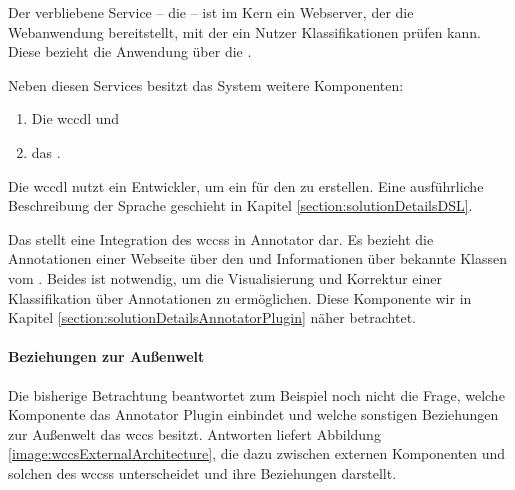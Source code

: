         Der verbliebene Service -- die {\webAppService} -- ist im Kern ein Webserver,
        der die Webanwendung bereitstellt,
        mit der ein Nutzer Klassifikationen prüfen kann.
        Diese bezieht die Anwendung über die {\classificationStorageAPI}.

        Neben diesen Services besitzt das System weitere Komponenten:

        \begin{enumerate}
            \item Die \gls{wccdl} und
            \item das {\annotatorPlugin}.
        \end{enumerate}

        Die \gls{wccdl} nutzt ein Entwickler, um ein {\classificationModel} für den
        {\classificationService} zu erstellen.
        Eine ausführliche Beschreibung der Sprache geschieht in Kapitel \ref{section:solutionDetailsDSL}.

        Das {\annotatorPlugin} stellt eine Integration des \glspl{wccs} in Annotator dar.
        Es bezieht die Annotationen einer Webseite über den {\annotationService}
        und Informationen über bekannte Klassen vom {\classificationService}.
        Beides ist notwendig, um die Visualisierung und Korrektur einer Klassifikation über Annotationen
        zu ermöglichen.
        Diese Komponente wir in Kapitel \ref{section:solutionDetailsAnnotatorPlugin} näher betrachtet.

        \paragraph{Beziehungen zur Außenwelt}
        Die bisherige Betrachtung beantwortet zum Beispiel noch nicht die Frage,
        welche Komponente das Annotator Plugin einbindet und welche sonstigen
        Beziehungen zur Außenwelt das \gls{wccs} besitzt.
        Antworten liefert Abbildung \ref{image:wccsExternalArchitecture},
        die dazu zwischen externen Komponenten und solchen des \glspl{wccs}
        unterscheidet und ihre Beziehungen darstellt.

